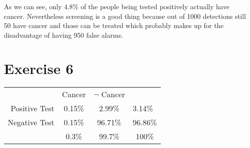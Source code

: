 As we can see, only 4.8\% of the people being tested positively actually have cancer. Nevertheless screening is a good thing because out of 1000 detections still 50 have cancer and those can be treated which probably makes up for the disadvantage of having 950 false alarms.  

\setcounter{equation}{0}
\section*{Exercise 6}

\begin{tabular}{ r|c|c|l }
\multicolumn{1}{r}{}
 &  \multicolumn{1}{c}{Cancer}
 & \multicolumn{1}{c}{$\neg$ Cancer} \\
\cline{2-3}
Positive Test & 0.15\% & 2.99\% & 3.14\%\\ 
\cline{2-3}
Negative Test & 0.15\% & 96.71\% & 96.86\% \\
\cline{2-3}
\multicolumn{1}{r}{}
 &  \multicolumn{1}{c}{0.3\%}
 & \multicolumn{1}{c}{99.7\%}  & \multicolumn{1}{c}{100\%}\\
\end{tabular}

